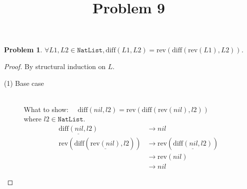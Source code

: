 \documentclass[12pt, a4paper]{article}
\title{Problem 9}
\date{\vspace{-5ex}}
\newtheorem{problem}{Problem}
\newcommand{\rmx}[1]{\mathrm{#1}}
\newcommand{\larrow}{\longrightarrow}
\newcommand{\under}{\underline}
\begin{document}
\maketitle

\begin{problem}
$\forall L1, L2 \in \mathtt{NatList}, \rmx{diff}(L1, L2) = \rmx{rev}(\rmx{diff}(\rmx{rev}(L1), L2))$.
\end{problem}
\begin{proof}
By structural induction on $L$.

\begin{description}
\item[(1) Base case]~\\
\noindent
What to show: $\quad \rmx{diff}(nil, l2) = \rmx{rev}(\rmx{diff}(\rmx{rev}(nil), l2))$ \\
where $l2 \in \mathtt{NatList}$.
\begin{align*}
\under{\rmx{diff}(nil, l2)}
	&\larrow nil \tag{by diff1} \\
\rmx{rev}(\rmx{diff}(\under{\rmx{rev}(nil)}, l2))
	&\larrow \rmx{rev}(\under{\rmx{diff}(nil, l2)}) \tag{by rev1} \\
	&\larrow \rmx{rev}(nil) \tag{by diff1} \\
	&\larrow nil \tag{by rev1}
\end{align*}


\end{description}
\end{proof}
\end{document}
